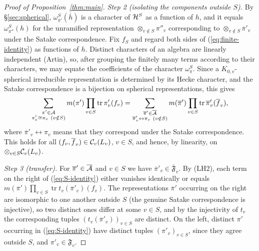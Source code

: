 \documentclass[12pt,letterpaper,openany]{book}
\theoremstyle{plain}
\theoremstyle{definition}
\theoremstyle{remark}
\theoremstyle{remark}
\newcommand{\tr}{\operatorname{tr}}
\begin{document}
\begin{proof}[Proof of Proposition~\ref{thm:main}]
{\em Step 2 (isolating the components outside $S$).} By
\S\ref{sec:spherical}, $\omega_{\overline{\pi}'}^S(\overline{h})$ is a
character of ${\cal H}^S$ as a function of $h$, and it equals
$\omega_{\pi''}^S(h)$ for the unramified representation
$\otimes_{v\notin S}\pi''_v$ corresponding to
$\otimes_{v\notin S}\overline{\pi}'_v$ under the Satake correspondence.
Fix $f_S$ and regard both sides of (\ref{eq:finite-identity}) as
functions of $h$. Distinct characters of an algebra are linearly
independent (Artin), so, after grouping the finitely many terms
according to their characters, we may equate the coefficients of the
character $\omega_\pi^S$. Since a $K_{0,v}$-spherical irreducible
representation is determined by its Hecke character, and the Satake
correspondence is a bijection on spherical representations, this gives
\begin{equation}\label{eq:S-identity}
\sum_{\substack{\pi'\in{\cal A}\\ \pi'_v\cong\pi_v\ (v\notin S)}}
m(\pi')\prod_{v\in S}\tr \pi'_v(f_v)
=\sum_{\substack{\overline{\pi}'\in\overline{{\cal A}}\\
\overline{\pi}'_v\leftrightarrow\pi_v\ (v\notin S)}}
m(\overline{\pi}')\prod_{v\in S}\tr \overline{\pi}'_v(\overline{f}_v),
\end{equation}
where $\overline{\pi}'_v\leftrightarrow\pi_v$ means that they correspond
under the Satake correspondence. This holds for all
$(f_v,\overline{f}_v)\in{\cal C}_v(L_v)$, $v\in S$, and hence, by
linearity, on $\otimes_{v\in S}{\cal C}_v(L_v)$.

{\em Step 3 (transfer).} For $\overline\pi'\in\overline{\cal A}$ and
$v\in S$ we have $\overline\pi'_v\in\overline{\mathfrak{F}}_v$. By (LH2),
each term on the right of
(\ref{eq:S-identity}) either vanishes identically or equals
$m(\overline{\pi}')\prod_{v\in S}\tr t_v(\overline{\pi}'_v)(f_v)$.
The representations $\overline{\pi}'$ occurring on the right are
isomorphic to one another outside $S$ (the genuine Satake correspondence
is injective), so two distinct ones differ at some $v\in S$, and by the
injectivity of $t_v$ the corresponding tuples
$(t_v(\overline{\pi}'_v))_{v\in S}$ are distinct. On the left, distinct
$\pi'$ occurring in (\ref{eq:S-identity}) have distinct tuples
$(\pi'_v)_{v\in S}$, since they agree outside $S$, and
$\pi'_v\in\mathfrak{F}_v$.


\end{proof}
\end{document}
